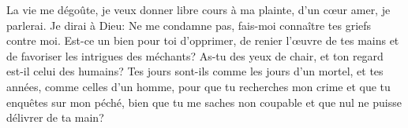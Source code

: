 La vie me dégoûte, je veux donner libre cours à ma plainte,
	d’un cœur amer, je parlerai.
Je dirai à Dieu: Ne me condamne pas,
	fais-moi connaître tes griefs contre moi.
Est-ce un bien pour toi d’opprimer, de renier l’œuvre de tes mains
	et de favoriser les intrigues des méchants?
As-tu des yeux de chair, et ton regard est-il celui des humains?
Tes jours sont-ils comme les jours d’un mortel, et tes années, comme celles d’un homme,
	pour que tu recherches mon crime et que tu enquêtes sur mon péché,
	bien que tu me saches non coupable et que nul ne puisse délivrer de ta main?

